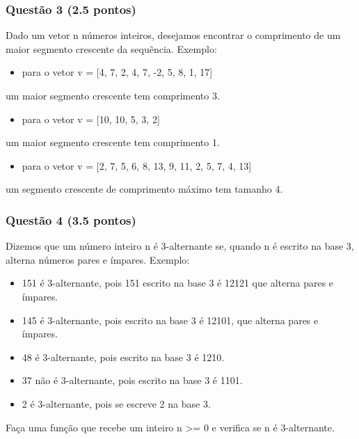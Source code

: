 \documentclass[a4paper]{article}
\begin{document}
\subsubsection{Questão 3 (2.5 pontos)}
\label{sec:org0996387}
Dado um vetor n números inteiros, desejamos encontrar o comprimento
de um maior segmento crescente da sequência.
Exemplo:
\begin{itemize}
\item para o vetor v = [4, 7, 2, 4, 7, -2, 5, 8, 1, 17]
\end{itemize}
um maior segmento crescente tem comprimento 3.
\begin{itemize}
\item para o vetor v = [10, 10, 5, 3, 2]
\end{itemize}
um maior segmento crescente tem comprimento 1.
\begin{itemize}
\item para o vetor v = [2, 7, 5, 6, 8, 13, 9, 11, 2, 5, 7, 4, 13]
\end{itemize}
um segmento crescente de comprimento máximo tem tamanho 4.

\subsubsection{Questão 4 (3.5 pontos)}
\label{sec:org558a15c}

Dizemos que um número inteiro n é 3-alternante se, quando n é escrito
 na base 3, alterna números pares e ímpares.
Exemplo:
\begin{itemize}
\item 151 é 3-alternante, pois 151 escrito na base 3 é 12121 que alterna pares e ímpares.
\item 145 é 3-alternante, pois escrito na base 3 é 12101, que alterna pares e ímpares.
\item 48 é 3-alternante, pois escrito na base 3 é 1210.
\item 37 não é 3-alternante, pois escrito na base 3 é 1101.
\item 2 é 3-alternante, pois se escreve 2 na base 3.
\end{itemize}
Faça uma função que recebe um inteiro n >= 0 e verifica se n é 3-alternante.
\end{document}
